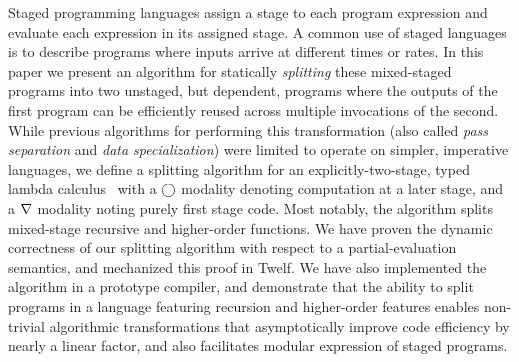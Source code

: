 
Staged programming languages assign a stage to each program expression
and evaluate each expression in its assigned stage. A common use of
staged languages is to describe programs where inputs arrive at
different times or rates. In this paper we present an algorithm for
statically {\em splitting} these mixed-staged programs into two
unstaged, but dependent, programs where the outputs of the first
program can be efficiently reused across multiple invocations of the
second. While previous algorithms for performing this transformation
(also called \emph{pass separation} and \emph{data specialization})
were limited to operate on simpler, imperative languages, we define a
splitting algorithm for an explicitly-two-stage, typed lambda
calculus \lang\ with a $\bigcirc$ modality denoting computation at a later
stage, and a $\nabla$ modality noting purely first stage code.  Most
notably, the algorithm splits mixed-stage recursive and higher-order
functions.  We have proven the dynamic correctness of our splitting
algorithm with respect to a partial-evaluation semantics, and
mechanized this proof in Twelf. We have also implemented the algorithm
in a prototype compiler, and demonstrate that the ability to split
programs in a language featuring recursion and higher-order features
enables non-trivial algorithmic transformations that asymptotically
improve code efficiency by nearly a linear factor, and also
facilitates modular expression of staged programs.


